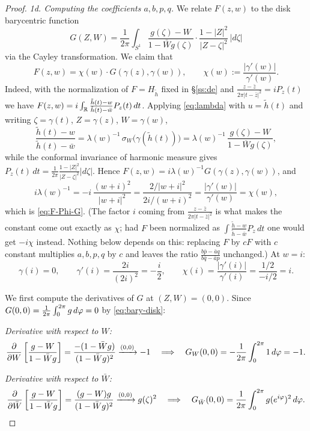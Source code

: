 \begin{proof}
	\medskip
	\noindent\textit{1d. Computing the coefficients $a, b, p, q$.}
	We relate $F(z,w)$ to the disk barycentric function
	\[
	G(Z,W) = \frac{1}{2\pi}\int_{S^1} \frac{g(\zeta) - W}{1 - \bar{W}g(\zeta)} \cdot \frac{1 - |Z|^2}{|Z - \zeta|^2}\,|d\zeta|
	\]
	via the Cayley transformation. We claim that
	\begin{equation}\label{eq:F-Phi-G}
		F(z,w) = \chi(w) \cdot G(\gamma(z), \gamma(w)),
		\qquad \chi(w) := \frac{|\gamma'(w)|}{\gamma'(w)} .
	\end{equation}
	Indeed, with the normalization of $F=H_{\tilde h}$ fixed in \S\ref{ss:de} and
	$\frac{z-\bar z}{2\pi|t-\bar z|^2}=iP_z(t)$ we have
	$F(z,w)=i\int_{\mathbb{R}}\frac{\tilde h(t)-w}{\tilde h(t)-\bar w}P_z(t)\,dt$. Applying
	\eqref{eq:lambda} with $u=\tilde h(t)$ and writing $\zeta=\gamma(t)$,
	$Z=\gamma(z)$, $W=\gamma(w)$,
	\[
	\frac{\tilde h(t)-w}{\tilde h(t)-\bar w}
	=\lambda(w)^{-1}\,\sigma_{W}\bigl(\gamma(\tilde h(t))\bigr)
	=\lambda(w)^{-1}\,\frac{g(\zeta)-W}{1-\overline Wg(\zeta)} ,
	\]
	while the conformal invariance of harmonic measure gives
	$P_z(t)\,dt=\frac{1}{2\pi}\frac{1-|Z|^2}{|Z-\zeta|^2}|d\zeta|$. Hence
	$F(z,w)=i\lambda(w)^{-1}G(\gamma(z),\gamma(w))$, and
	\[
	i\lambda(w)^{-1}=-i\,\frac{(w+i)^2}{|w+i|^2}
	=\frac{2/|w+i|^{2}}{2i/(w+i)^{2}}
	=\frac{|\gamma'(w)|}{\gamma'(w)}=\chi(w),
	\]
	which is \eqref{eq:F-Phi-G}. (The factor $i$ coming from
	$\frac{z-\bar z}{2\pi|t-\bar z|^2}$ is what makes the constant come out exactly
	as $\chi$; had $F$ been normalized as $\int\frac{\tilde h-w}{\tilde h-\bar w}P_z\,dt$
	one would get $-i\chi$ instead. Nothing below depends on this: replacing $F$ by
	$cF$ with $c$ constant multiplies $a,b,p,q$ by $c$ and leaves the ratio
	$\frac{b\bar p-\bar aq}{b\bar q-\bar ap}$ unchanged.)
	At $w = i$:
	\[
	\gamma(i) = 0, \qquad \gamma'(i) = \frac{2i}{(2i)^2} = -\frac{i}{2}, \qquad \chi(i) = \frac{|\gamma'(i)|}{\gamma'(i)} = \frac{1/2}{-i/2} = i.
	\]
	
	We first compute the derivatives of $G$ at $(Z,W) = (0,0)$. Since $G(0,0) = \frac{1}{2\pi}\int_0^{2\pi} g \,d\varphi = 0$ by \eqref{eq:bary-disk}:
	
	\textit{Derivative with respect to $W$:}
	\[
	\frac{\partial}{\partial W}\left[\frac{g - W}{1 - \bar{W}g}\right] = \frac{-(1 - \bar{W}g)}{(1 - \bar{W}g)^2} \xrightarrow{(0,0)} -1 \quad\Longrightarrow\quad G_W(0,0) = -\frac{1}{2\pi}\int_0^{2\pi} 1 \,d\varphi = -1.
	\]
	
	\textit{Derivative with respect to $\bar{W}$:}
	\[
	\frac{\partial}{\partial \bar{W}}\left[\frac{g - W}{1 - \bar{W}g}\right] = \frac{(g - W)g}{(1 - \bar{W}g)^2} \xrightarrow{(0,0)} g(\zeta)^2 \quad\Longrightarrow\quad G_{\bar{W}}(0,0) = \frac{1}{2\pi}\int_0^{2\pi} g(e^{i\varphi})^2 \,d\varphi.
	\]
	

\end{proof}
